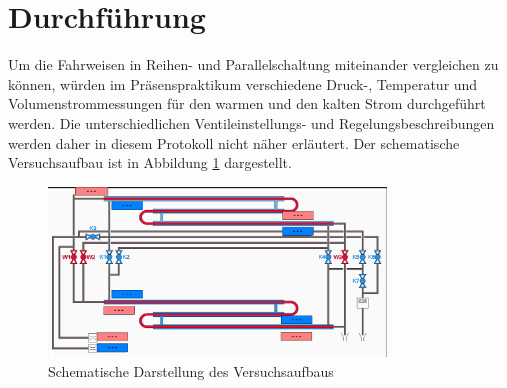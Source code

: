 \section{Durchführung}
\label{sec:durchfuerung}

Um die Fahrweisen in Reihen- und Parallelschaltung miteinander vergleichen zu können, würden im Präsenspraktikum verschiedene Druck-, Temperatur und Volumenstrommessungen für den warmen und den kalten Strom durchgeführt werden. Die unterschiedlichen Ventileinstellungs- und Regelungsbeschreibungen werden daher in diesem Protokoll nicht näher erläutert. Der schematische Versuchsaufbau ist in Abbildung \ref{fig:schema} dargestellt.
\vspace{2mm}

\begin{figure}[h!]
	\centering
	\includegraphics[width=0.8\textwidth]{img/schema}
	\caption{Schematische Darstellung des Versuchsaufbaus}
	\label{fig:schema}
\end{figure}
\FloatBarrier
